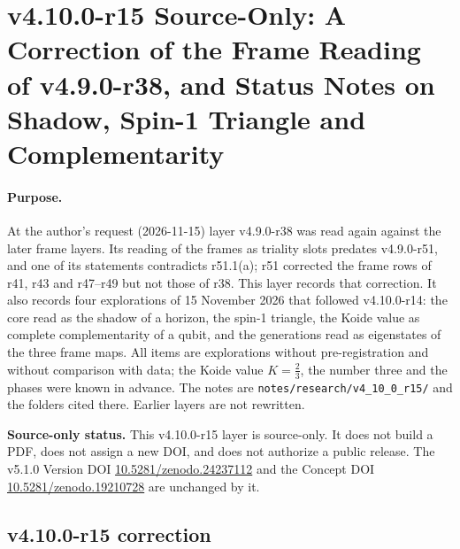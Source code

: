 
\clearpage
\section*{v4.10.0-r15 Source-Only: A Correction of the Frame Reading of v4.9.0-r38, and Status Notes on Shadow, Spin-1 Triangle and Complementarity}
\label{sec:v4100-r15-r38-correction-complementarity}

\paragraph{Purpose.}
At the author's request (2026-11-15) layer v4.9.0-r38 was read again against the later frame layers.  Its reading of the
frames as triality slots predates v4.9.0-r51, and one of its statements contradicts r51.1(a); r51 corrected the frame rows
of r41, r43 and r47--r49 but not those of r38.  This layer records that correction.  It also records four explorations of
15 November 2026 that followed v4.10.0-r14: the core read as the shadow of a horizon, the spin-1 triangle, the Koide value
as complete complementarity of a qubit, and the generations read as eigenstates of the three frame maps.  All items are
explorations without pre-registration and without comparison with data; the Koide value \(K=\tfrac23\), the number three
and the phases were known in advance.  The notes are
\texttt{notes/\allowbreak research/\allowbreak v4\_10\_0\_r15/} and the folders cited there.  Earlier layers are not
rewritten.

\noindent\textbf{Source-only status.}
This v4.10.0-r15 layer is source-only.  It does not build a PDF, does not assign a new DOI,
and does not authorize a public release.  The v5.1.0 Version DOI
\href{https://doi.org/10.5281/zenodo.24237112}{10.5281/zenodo.24237112} and the Concept DOI
\href{https://doi.org/10.5281/zenodo.19210728}{10.5281/zenodo.19210728} are unchanged by it.

\subsection*{v4.10.0-r15 correction}
\label{subsec:v4100-r15-correction}

